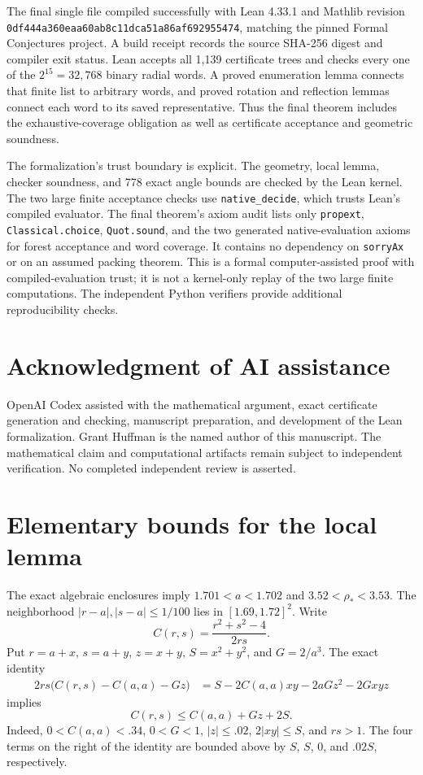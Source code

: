 \documentclass[11pt]{amsart}
\theoremstyle{definition}
\theoremstyle{remark}
\numberwithin{equation}{section}
\newcommand{\abs}[1]{\lvert #1\rvert}
\newcommand{\rhoopt}{\rho_*}
\begin{document}
The final single file compiled successfully with Lean 4.33.1 and Mathlib
revision \texttt{0df444a360eaa60ab8c11dca51a86af692955474}, matching the
pinned Formal Conjectures project. A build receipt records the source
SHA-256 digest and compiler exit status. Lean accepts all 1,139 certificate
trees and checks every one of the $2^{15}=32{,}768$ binary radial words.
A proved enumeration lemma connects that finite list to arbitrary words,
and proved rotation and reflection lemmas connect each word to its saved
representative. Thus the final theorem includes the exhaustive-coverage
obligation as well as certificate acceptance and geometric soundness.

The formalization's trust boundary is explicit. The geometry, local lemma,
checker soundness, and 778 exact angle bounds are checked by the Lean
kernel. The two large finite acceptance checks use \texttt{native\_decide},
which trusts Lean's compiled evaluator. The final theorem's axiom audit
lists only \texttt{propext}, \texttt{Classical.choice}, \texttt{Quot.sound},
and the two generated native-evaluation axioms for forest acceptance and
word coverage. It contains no dependency on \texttt{sorryAx} or on an
assumed packing theorem. This is a formal computer-assisted proof with
compiled-evaluation trust; it is not a kernel-only replay of the two large
finite computations. The independent Python verifiers provide additional
reproducibility checks.

\section*{Acknowledgment of AI assistance}
OpenAI Codex assisted with the mathematical argument, exact certificate
generation and checking, manuscript preparation, and development of the
Lean formalization. Grant Huffman is the named author of this manuscript.
The mathematical claim and computational artifacts remain subject to
independent verification. No completed independent review is asserted.

\appendix
\section{Elementary bounds for the local lemma}\label{app:derivatives}

The exact algebraic enclosures imply
$1.701<a<1.702$ and $3.52<\rhoopt<3.53$. The neighborhood
$\abs{r-a},\abs{s-a}\leq1/100$ lies in $[1.69,1.72]^2$.
Write
\[
 C(r,s)=\frac{r^2+s^2-4}{2rs}.
\]
Put $r=a+x$, $s=a+y$, $z=x+y$, $S=x^2+y^2$, and $G=2/a^3$.
The exact identity
\begin{align*}
 2rs\bigl(C(r,s)-C(a,a)-Gz\bigr)
 &=S-2C(a,a)xy-2aGz^2-2Gxyz
\end{align*}
implies
\begin{equation}\label{eq:affinecos}
 C(r,s)\leq C(a,a)+Gz+2S.
\end{equation}
Indeed, $0<C(a,a)<.34$, $0<G<1$, $|z|\leq.02$,
$2|xy|\leq S$, and $rs>1$. The four terms on the right of the identity
are bounded above by $S$, $S$, $0$, and $.02S$, respectively.
\end{document}
